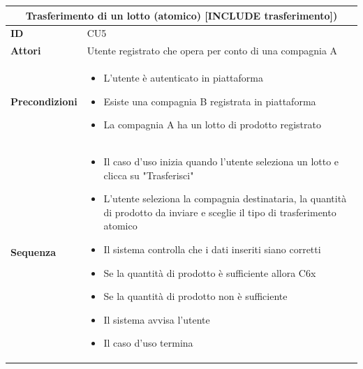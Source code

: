 \documentclass[a4paper,11pt]{article}
\begin{document}
\begin{table}[H]
  \centering
  \begin{tabular}{|m{2cm}|m{10.5cm}|}
    \hline
    \multicolumn{2}{|c|}{\textbf{Trasferimento di un lotto (atomico) [INCLUDE trasferimento])}}                  \\ \hline
    \multicolumn{1}{|l|}{\textbf{ID}}                 & CU5                                                      \\ \hline
    \multicolumn{1}{|l|}{\textbf{Attori}}             & Utente registrato che opera per conto di una compagnia A \\ \hline
    \multicolumn{1}{|l|}{\textbf{Precondizioni}}      &
    \begin{itemize}
      \item L'utente è autenticato in piattaforma
      \item Esiste una compagnia B registrata in piattaforma
      \item La compagnia A ha un lotto di prodotto registrato
    \end{itemize}
    \\ \hline
    \multicolumn{1}{|l|}{\textbf{Sequenza}}           &

    \begin{itemize}
      \item Il caso d'uso inizia quando l'utente seleziona un lotto e clicca su "Trasferisci"
      \item L'utente seleziona la compagnia destinataria, la quantità di prodotto da inviare e sceglie il tipo di trasferimento atomico
      \item Il sistema controlla che i dati inseriti siano corretti
      \item Se la quantità di prodotto è sufficiente allora C6x
      \item Se la quantità di prodotto non è sufficiente
      \item Il sistema avvisa l'utente
      \item Il caso d'uso termina
    \end{itemize}


\end{tabular}
\end{table}
\end{document}
